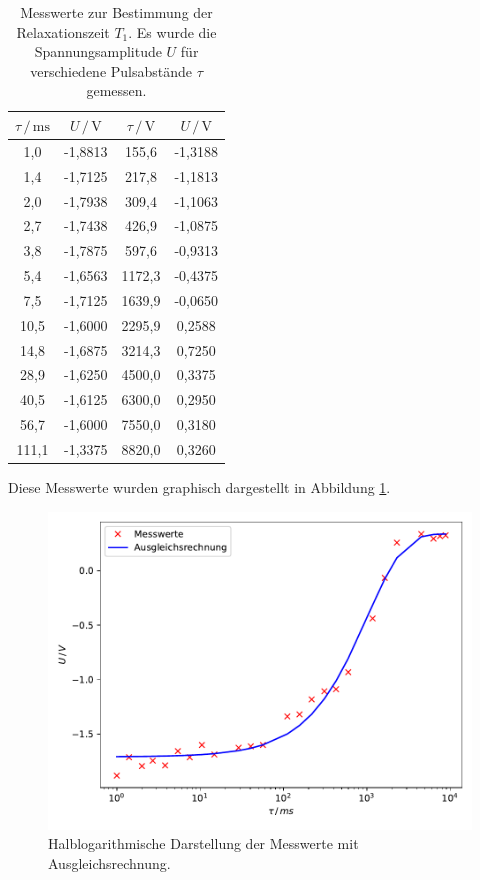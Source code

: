 \begin{table}
  \centering
  \caption{Messwerte zur Bestimmung der Relaxationszeit $T_1$. Es wurde die Spannungsamplitude $U$ für verschiedene Pulsabstände $\tau$ gemessen.}
  \label{tab:mess1}
  \begin{tabular}{c c c c}
  \toprule
  $\tau \,/\, \si{\milli\second}$ & $U \,/\, \si{\volt}$ & $\tau \,/\, \si{\volt}$
  & $U \,/\, \si{\volt}$\\
  \midrule 
        1,0 & -1,8813 &  155,6 & -1,3188\\
        1,4 & -1,7125 &  217,8 & -1,1813\\
        2,0 & -1,7938 &  309,4 & -1,1063\\
        2,7 & -1,7438 &  426,9 & -1,0875\\
        3,8 & -1,7875 &  597,6 & -0,9313\\
        5,4 & -1,6563 & 1172,3 & -0,4375\\
        7,5 & -1,7125 & 1639,9 & -0,0650\\
       10,5 & -1,6000 & 2295,9 &  0,2588\\
       14,8 & -1,6875 & 3214,3 &  0,7250\\
       28,9 & -1,6250 & 4500,0 &  0,3375\\
       40,5 & -1,6125 & 6300,0 &  0,2950\\
       56,7 & -1,6000 & 7550,0 &  0,3180\\
      111,1 & -1,3375 & 8820,0 &  0,3260\\
  \bottomrule
  \end{tabular}
\end{table}

Diese Messwerte wurden graphisch dargestellt in Abbildung \ref{fig:plot1}. 

\begin{figure}
  \centering
  \includegraphics[scale=0.7]{content/plot1.pdf}
  \caption{Halblogarithmische Darstellung der Messwerte mit Ausgleichsrechnung.}
  \label{fig:plot1}
\end{figure}


